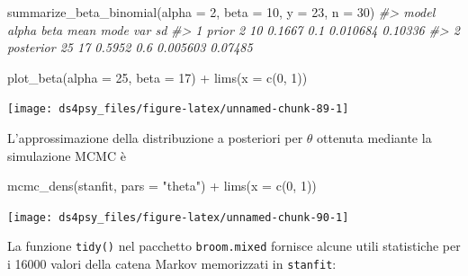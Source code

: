 \documentclass[
  11pt,
]{krantz}
\makeatletter
\newenvironment{Shaded}{\begin{snugshade}}{\end{snugshade}}
\newcommand{\AttributeTok}[1]{\textcolor[rgb]{0.61,0.61,0.61}{#1}}
\newcommand{\CommentTok}[1]{\textcolor[rgb]{0.37,0.37,0.37}{\textit{#1}}}
\newcommand{\DecValTok}[1]{\textcolor[rgb]{0.06,0.06,0.06}{#1}}
\newcommand{\FunctionTok}[1]{\textcolor[rgb]{0,0,0}{#1}}
\newcommand{\NormalTok}[1]{#1}
\newcommand{\SpecialCharTok}[1]{\textcolor[rgb]{0,0,0}{#1}}
\newcommand{\StringTok}[1]{\textcolor[rgb]{0.5,0.5,0.5}{#1}}
\newenvironment{kframe}{%
\medskip{}
\setlength{\fboxsep}{.8em}
 \def\at@end@of@kframe{}%
 \ifinner\ifhmode%
  \def\at@end@of@kframe{\end{minipage}}%
  \begin{minipage}{\columnwidth}%
 \fi\fi%
 \def\FrameCommand##1{\hskip\@totalleftmargin \hskip-\fboxsep
 \colorbox{shadecolor}{##1}\hskip-\fboxsep
     \hskip-\linewidth \hskip-\@totalleftmargin \hskip\columnwidth}%
 \MakeFramed {\advance\hsize-\width
   \@totalleftmargin\z@ \linewidth\hsize
   \@setminipage}}%
 {\par\unskip\endMakeFramed%
 \at@end@of@kframe}
\renewenvironment{Shaded}{\begin{kframe}}{\end{kframe}}
\theoremstyle{definition}
\theoremstyle{definition}
\theoremstyle{definition}
\theoremstyle{definition}
\theoremstyle{remark}
\makeatother
\begin{document}
\begin{Shaded}
\begin{Highlighting}[]
\FunctionTok{summarize\_beta\_binomial}\NormalTok{(}\AttributeTok{alpha =} \DecValTok{2}\NormalTok{, }\AttributeTok{beta =} \DecValTok{10}\NormalTok{, }\AttributeTok{y =} \DecValTok{23}\NormalTok{, }\AttributeTok{n =} \DecValTok{30}\NormalTok{)}
\CommentTok{\#\textgreater{}       model alpha beta   mean mode      var      sd}
\CommentTok{\#\textgreater{} 1     prior     2   10 0.1667  0.1 0.010684 0.10336}
\CommentTok{\#\textgreater{} 2 posterior    25   17 0.5952  0.6 0.005603 0.07485}
\end{Highlighting}
\end{Shaded}

\begin{Shaded}
\begin{Highlighting}[]
\FunctionTok{plot\_beta}\NormalTok{(}\AttributeTok{alpha =} \DecValTok{25}\NormalTok{, }\AttributeTok{beta =} \DecValTok{17}\NormalTok{) }\SpecialCharTok{+} 
  \FunctionTok{lims}\NormalTok{(}\AttributeTok{x =} \FunctionTok{c}\NormalTok{(}\DecValTok{0}\NormalTok{, }\DecValTok{1}\NormalTok{))}
\end{Highlighting}
\end{Shaded}

\begin{center}\texttt{[image: ds4psy\_files/figure-latex/unnamed-chunk-89-1]} \end{center}

L'approssimazione della distribuzione a posteriori per \(\theta\) ottenuta mediante la simulazione MCMC è

\begin{Shaded}
\begin{Highlighting}[]
\FunctionTok{mcmc\_dens}\NormalTok{(stanfit, }\AttributeTok{pars =} \StringTok{"theta"}\NormalTok{) }\SpecialCharTok{+} 
  \FunctionTok{lims}\NormalTok{(}\AttributeTok{x =} \FunctionTok{c}\NormalTok{(}\DecValTok{0}\NormalTok{, }\DecValTok{1}\NormalTok{))}
\end{Highlighting}
\end{Shaded}

\begin{center}\texttt{[image: ds4psy\_files/figure-latex/unnamed-chunk-90-1]} \end{center}

La funzione \texttt{tidy()} nel pacchetto \texttt{broom.mixed} fornisce alcune utili statistiche per i 16000 valori della catena Markov memorizzati in \texttt{stanfit}:
\end{document}
